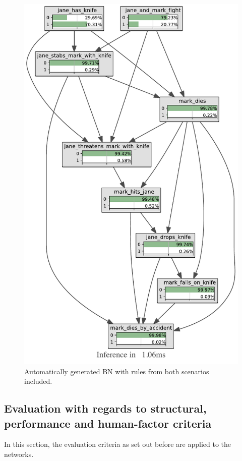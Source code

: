 \begin{figure}[htbp]
\begin{center}
\includegraphics[scale=0.8]{../experiments/VlekNetwork/bnImage/BNIMAGEKBFull.pdf}
\caption{Automatically generated BN with rules from both scenarios included.}
\label{full}
\end{center}
\end{figure}


\subsection{Evaluation with regards to structural, performance and human-factor criteria}
In this section, the evaluation criteria as set out before are applied to the networks.


